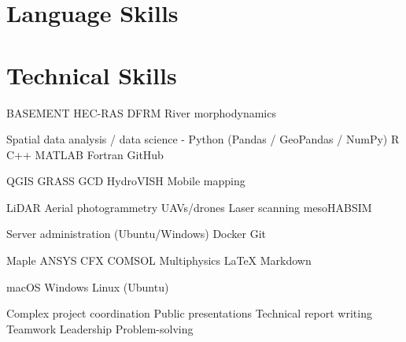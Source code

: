 
\section{Language Skills}

\sectionsep

\sectionsep

\sectionsep

\section{Technical Skills}

BASEMENT \textbullet{} HEC-RAS \textbullet{} DFRM \textbullet{} River morphodynamics
\sectionsep

Spatial data analysis / data science - Python (Pandas / GeoPandas / NumPy) \textbullet{} R \textbullet{} C++ \textbullet{} MATLAB \textbullet{} Fortran \textbullet{} GitHub
\sectionsep

QGIS \textbullet{} GRASS \textbullet{} GCD \textbullet{} HydroVISH \textbullet{} Mobile mapping
\sectionsep

LiDAR \textbullet{} Aerial photogrammetry \textbullet{} UAVs/drones \textbullet{} Laser scanning \textbullet{} mesoHABSIM
\sectionsep

Server administration (Ubuntu/Windows) \textbullet{} Docker \textbullet{} Git
\sectionsep

Maple \textbullet{} ANSYS CFX \textbullet{} COMSOL Multiphysics \textbullet{} LaTeX \textbullet{} Markdown
\sectionsep

macOS \textbullet{} Windows \textbullet{} Linux (Ubuntu)
\sectionsep

Complex project coordination \textbullet{} Public presentations \textbullet{} Technical report writing \textbullet{} Teamwork \textbullet{} Leadership \textbullet{} Problem-solving
\sectionsep
